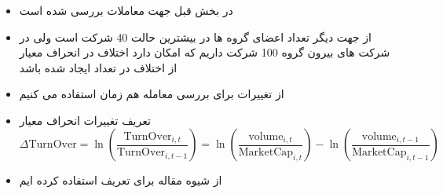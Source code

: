 \documentclass[12pt, a4paper]{article}
\begin{document}
 \subsubsection{}
\begin{itemize}
	\item 
	در بخش قبل جهت معاملات بررسی شده است
	\item 
	از جهت دیگر تعداد اعضای گروه ها در بیشترین حالت 40 شرکت است ولی در شرکت های بیرون گروه 100 شرکت داریم که امکان دارد اختلاف در انحراف معیار از اختلاف در تعداد ایجاد شده باشد
	\item 
	از تغییرات 
	برای بررسی معامله هم زمان استفاده می کنیم
	\item 
	تعریف تغییرات انحراف معیار
	\begin{equation}
			\Delta \text{TurnOver} = \ln(\frac{\text{TurnOver}_{i,t}}{\text{TurnOver}_{i,t-1}}) = 
		\ln({\frac{\text{volume}_{i,t}}{\text{MarketCap}_{i,t}}}) - \ln({\frac{\text{volume}_{i,t-1}}{\text{MarketCap}_{i,t-1}}})
	\end{equation}
	\item 
	از شیوه مقاله 
	برای تعریف استفاده کرده ایم
\end{itemize}
\end{document}
